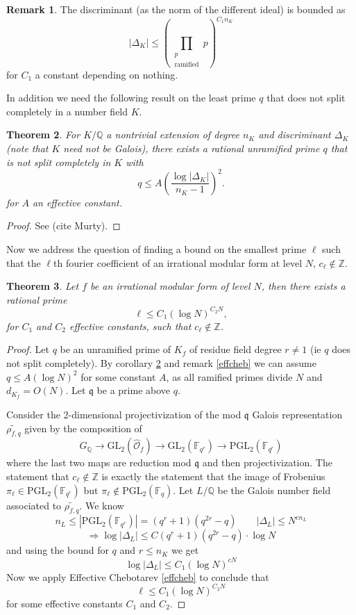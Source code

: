 \documentclass[12pt]{amsart}
\newtheorem{thm}{Theorem}[section]
\theoremstyle{definition}
\newtheorem{rem}[thm]{Remark}
\def\F{{\mathbb F}}
\def\O{{\mathcal O}}
\def\Q{{\mathbb Q}}
\def\Z{{\mathbb Z}}
\newcommand{\GL}{\text{GL}}
\newcommand{\PGL}{\text{PGL}}
\newcommand{\pfrac}[2]{\left( \frac{#1}{#2} \right)}
\begin{document}
\begin{rem}\label{bounddisc} The discriminant (as the norm of the different ideal) is bounded as
\[|\Delta_K| \leq \left( \prod_{\substack{p \\ \text{ramified}}} p \right)^{C_1n_K} \]
for $C_1$ a constant depending on nothing.
\end{rem}

In addition we need the following result on the least prime $q$ that does not split completely in a number field $K$.

\begin{thm}\label{nonsplitcom}
For $K/\Q$ a nontrivial extension of degree $n_K$ and discriminant $\Delta_K$ (note that $K$ need not be Galois), there exists a rational unramified prime $q$ that is not split completely in $K$ with
\[ q \leq A\pfrac{\log |\Delta_K|}{n_K-1}^2.\] 
for $A$ an effective constant.
\end{thm}
\begin{proof}
See (cite Murty).
\end{proof}

Now we address the question of finding a bound on the smallest prime $\ell$ such that the $\ell$th fourier coefficient of an irrational modular form at level $N$, $c_\ell \not\in\Z$.

\begin{thm}\label{notinZ}
Let $f$ be an irrational modular form of level $N$, then there exists a rational prime
\[\ell \leq C_1 \left( \log{N} \right)^{C_2N},  \]
for $C_1$ and $C_2$ effective constants, such that $c_\ell \not\in \Z$.
\end{thm}
\begin{proof}
Let $q$ be an unramified prime of $K_f$ of residue field degree $r \neq 1$ (ie $q$ does not split completely).  By corollary \ref{nonsplitcom} and remark \ref{effcheb} we can assume $q \leq A(\log N)^2$ for some constant $A$, as all ramified primes divide $N$ and $d_{K_f} = O(N)$.  Let $\mathfrak{q}$ be a prime above $q$.

Consider the 2-dimensional projectivization of the mod $\mathfrak{q}$ Galois representation $\widetilde{\rho_{f,q}}$ given by the composition of
\[ G_{\Q} \rightarrow\GL_2(\hat{\O}_f) \rightarrow \GL_2(\F_{q^r}) \rightarrow \PGL_2(\F_{q^r})  \]
where the last two maps are reduction mod $\mathfrak{q}$ and then projectivization.  The statement that $c_\ell \not\in \Z$ is exactly the statement that the image of Frobenius $\pi_\ell \in \PGL_2(\F_{q^r})$ but $\pi_\ell \not\in \PGL_2(\F_q)$.  Let $L/\Q$ be the Galois number field associated to $\widetilde{\rho_{f,q}}$.  We know
\[ n_L \leq |\PGL_2(\F_{q^r})| = (q^{r}+1)(q^{2r}-q) \qquad |\Delta_L| \leq N^{cn_L} \]
\[\Rightarrow \log|\Delta_L| \leq C(q^{r}+1)(q^{2r}-q) \cdot \log{N} \]
and using the bound for $q$ and $r \leq n_K$ we get
\[  \log|\Delta_L| \leq C_1 \left( \log{N} \right)^{cN} \]
Now we apply Effective Chebotarev \ref{effcheb} to conclude that
\[ \ell \leq C_1 \left( \log{N} \right)^{C_2N} \]
for some effective constants $C_1$ and $C_2$.
\end{proof}
\end{document}
